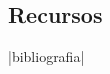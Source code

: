 \documentclass[landscape,10pt,oneside,oldfontcommands]{memoir} %
\begin{document}
\begin{comment}
\chapter{Probabilidad}\label{prob}
\monta|cap-11-probabilidad|


\chapter{Miscel\'anea}
\monta|cap-12-miscelanea|


\end{comment}


\begin{appendices}
\chapter{Recursos}
 \monta|bibliografia|
\end{appendices}
\end{document}
